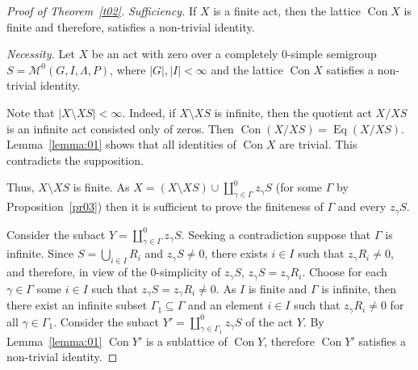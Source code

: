 \documentclass{birkau}
\numberwithin{equation}{section}
\theoremstyle{plain}
\theoremstyle{definition}
\DeclareMathOperator{\Con}{Con}
\DeclareMathOperator{\Eq}{Eq}
\begin{document}
	\begin{proof}[Proof of Theorem~\ref{t02}]
		\textit{Sufficiency.} If $X$ is a finite act, then the lattice  $\Con X$ is finite and therefore, satisfies a non-trivial identity.
		
		\textit{Necessity.} Let $X$ be an act with zero over a completely 0-simple semigroup $S={\mathcal M}^0(G,I,\Lambda,P)$, where $|G|,|I| <\infty$ and the lattice $\Con X$ satisfies a non-trivial identity.

        Note that $|X\setminus XS|<\infty$. Indeed, if $X\setminus XS$ is infinite, then the quotient act $X/XS$ is an infinite act consisted only of zeros. Then $\Con (X/XS) = \Eq (X/XS)$. Lemma~\ref{lemma:01} shows that all identities of $\Con X$ are trivial. This contradicts the supposition.

        Thus, $X\setminus XS$ is finite. As $X=(X\setminus XS)\cup \coprod_{\gamma \in \Gamma}^0 z_\gamma S$ (for some $\Gamma$ by Proposition~\ref{pr03}) then it is sufficient to prove the finiteness of $\Gamma$ and every $z_\gamma S$.

        Consider the subact $Y=\coprod_{\gamma \in \Gamma}^0 z_\gamma S$. Seeking a contradiction suppose that $\Gamma$ is infinite. Since $S=\bigcup_{i \in I}R_i$ and $z_\gamma S \ne 0$, there exists $i \in I$ such that $z_\gamma R_i \ne 0$, and therefore, in view of the 0-simplicity of $z_\gamma S$, $z_\gamma S = z_\gamma R_i$. Choose for each $\gamma \in \Gamma$ some $i \in I$ such that $z_\gamma S = z_\gamma R_i \ne 0$. As $I$ is finite and $\Gamma$ is infinite, then there exist an infinite subset $\Gamma_1 \subseteq \Gamma$ and an element $i \in I$ such that $z_\gamma R_i \ne 0$ for all $\gamma \in \Gamma_1$. Consider the subact $Y' =\coprod_{\gamma \in \Gamma_1}^0 z_\gamma S$ of the act $Y$. By Lemma~\ref{lemma:01} $\Con Y'$ is a sublattice of $\Con Y$, therefore $\Con Y'$ satisfies a non-trivial identity.


\end{proof}
\end{document}
